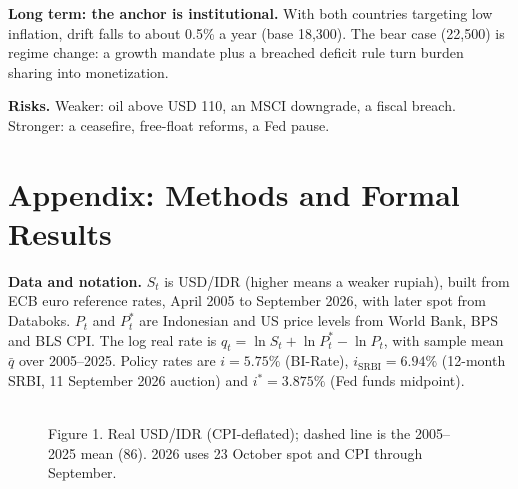 \documentclass[10pt]{article}
\theoremstyle{plain}\newtheorem{proposition}{Proposition}
\theoremstyle{remark}\newtheorem*{remark}{Remark}
\begin{document}
\textbf{Long term: the anchor is institutional.} With both countries targeting low inflation, drift falls to about 0.5\% a year (base 18,300). The bear case (22,500) is regime change: a growth mandate plus a breached deficit rule turn burden sharing into monetization.

\textbf{Risks.} Weaker: oil above USD 110, an MSCI downgrade, a fiscal breach. Stronger: a ceasefire, free-float reforms, a Fed pause.

\newpage
\section*{Appendix: Methods and Formal Results}
\textbf{Data and notation.} $S_t$ is USD/IDR (higher means a weaker rupiah), built from ECB euro reference rates, April 2005 to September 2026, with later spot from Databoks. $P_t$ and $P_t^*$ are Indonesian and US price levels from World Bank, BPS and BLS CPI. The log real rate is $q_t=\ln S_t+\ln P_t^*-\ln P_t$, with sample mean $\bar q$ over 2005--2025. Policy rates are $i=5.75\%$ (BI-Rate), $i_{\mathrm{SRBI}}=6.94\%$ (12-month SRBI, 11 September 2026 auction) and $i^*=3.875\%$ (Fed funds midpoint).

\begin{figure}[h]
\centering
{}\\[-2pt]
{\scriptsize Figure 1. Real USD/IDR (CPI-deflated); dashed line is the 2005--2025 mean (86). 2026 uses 23 October spot and CPI through September.}
\end{figure}
\end{document}
